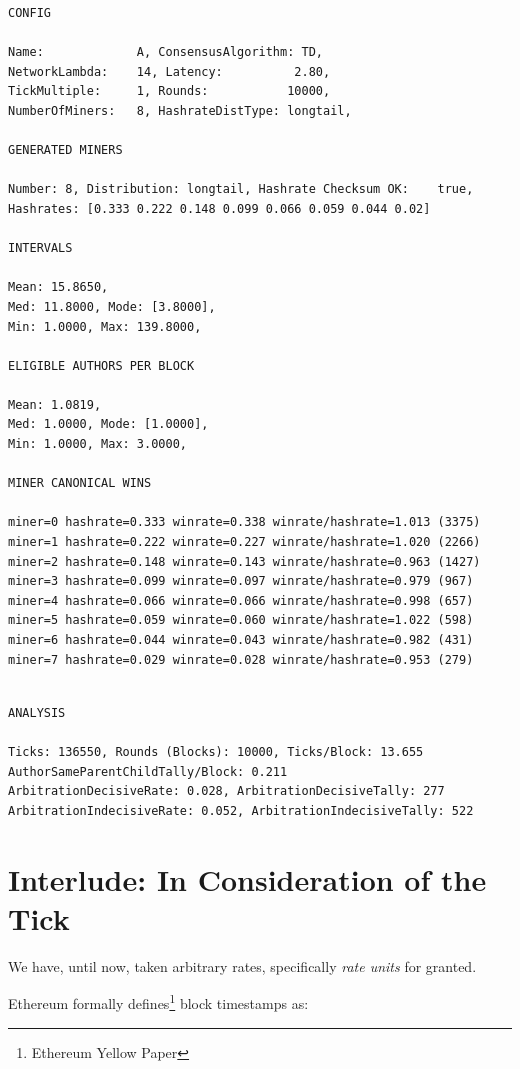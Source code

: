 \documentclass[11pt]{article}
\theoremstyle{plain}
\begin{document}
\begin{verbatim}
CONFIG

Name:             A, ConsensusAlgorithm: TD,
NetworkLambda:    14, Latency:          2.80,
TickMultiple:     1, Rounds:           10000,
NumberOfMiners:   8, HashrateDistType: longtail,

GENERATED MINERS

Number: 8, Distribution: longtail, Hashrate Checksum OK:    true,
Hashrates: [0.333 0.222 0.148 0.099 0.066 0.059 0.044 0.02]

INTERVALS

Mean: 15.8650,
Med: 11.8000, Mode: [3.8000],
Min: 1.0000, Max: 139.8000,

ELIGIBLE AUTHORS PER BLOCK

Mean: 1.0819,
Med: 1.0000, Mode: [1.0000],
Min: 1.0000, Max: 3.0000,

MINER CANONICAL WINS

miner=0 hashrate=0.333 winrate=0.338 winrate/hashrate=1.013 (3375)
miner=1 hashrate=0.222 winrate=0.227 winrate/hashrate=1.020 (2266)
miner=2 hashrate=0.148 winrate=0.143 winrate/hashrate=0.963 (1427)
miner=3 hashrate=0.099 winrate=0.097 winrate/hashrate=0.979 (967)
miner=4 hashrate=0.066 winrate=0.066 winrate/hashrate=0.998 (657)
miner=5 hashrate=0.059 winrate=0.060 winrate/hashrate=1.022 (598)
miner=6 hashrate=0.044 winrate=0.043 winrate/hashrate=0.982 (431)
miner=7 hashrate=0.029 winrate=0.028 winrate/hashrate=0.953 (279)

\end{verbatim}
\pagebreak
\begin{verbatim}

ANALYSIS

Ticks: 136550, Rounds (Blocks): 10000, Ticks/Block: 13.655
AuthorSameParentChildTally/Block: 0.211
ArbitrationDecisiveRate: 0.028, ArbitrationDecisiveTally: 277
ArbitrationIndecisiveRate: 0.052, ArbitrationIndecisiveTally: 522

\end{verbatim}


\section{\normalsize{Interlude: In Consideration of the Tick}}

We have, until now, taken arbitrary rates, specifically \emph{rate units} for 
granted.

Ethereum formally defines\footnote{Ethereum Yellow Paper} block timestamps as:
\end{document}
